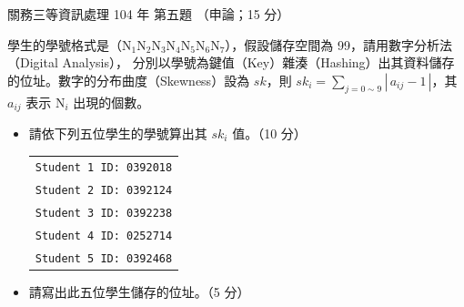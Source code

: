 \begin{pastexam}[label={px:gw3-104-ds-05}]{關務三等資訊處理 104 年 第五題}
（申論；15 分）

學生的學號格式是（N$_{1}$N$_{2}$N$_{3}$N$_{4}$N$_{5}$N$_{6}$N$_{7}$），假設儲存空間為 99，請用數字分析法（Digital Analysis），
分別以學號為鍵值（Key）雜湊（Hashing）出其資料儲存的位址。數字的分布曲度（Skewness）設為 $sk$，則
$sk_{i} = \sum\limits_{j=0\sim 9} |\,a_{ij} - 1\,|$，其 $a_{ij}$ 表示 N$_{i}$ 出現的個數。
\begin{itemize}[leftmargin=2.2em, nosep]
\item[㈠] 請依下列五位學生的學號算出其 $sk_{i}$ 值。（10 分）

\begin{tabular}{@{}l}
\texttt{Student 1 ID: 0392018} \\
\texttt{Student 2 ID: 0392124} \\
\texttt{Student 3 ID: 0392238} \\
\texttt{Student 4 ID: 0252714} \\
\texttt{Student 5 ID: 0392468}
\end{tabular}
\item[㈡] 請寫出此五位學生儲存的位址。（5 分）
\end{itemize}
\end{pastexam}

